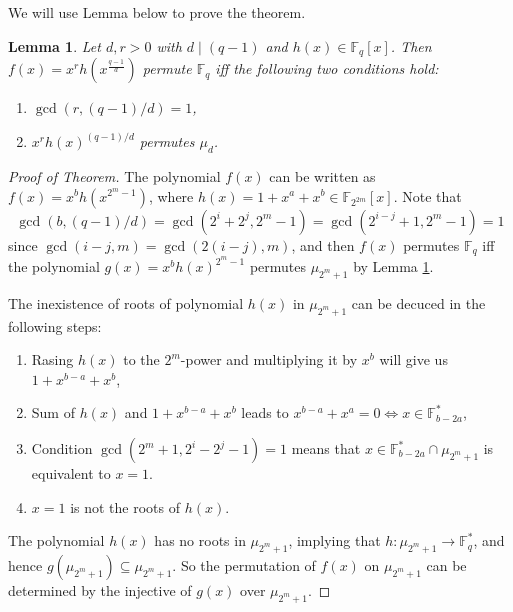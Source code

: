 \documentclass[12 pt]{article}
\newtheorem{lemma}{Lemma}
\def\F{{\mathbb F}}
\begin{document}
    We will use Lemma below to prove the theorem.
    \begin{lemma}\label{Lm:permutation_twocondition}
      Let $ d,r>0 $ with $ d\mid(q-1) $ and $ h(x)\in\F_q[x] $. Then $ f(x)=x^rh(x^{\frac{q-1}{d}}) $ permute $ \F_q $ iff the following two conditions hold:
      \begin{enumerate}[label=(\arabic{*})]
        \item $ \gcd(r,(q-1)/d)=1 $,
        \item $ x^rh(x)^{(q-1)/{d}} $ permutes $ \mu_d $.
      \end{enumerate}
    \end{lemma}

    \begin{proof}[Proof of Theorem]
      The polynomial $ f(x) $ can be written as $ f(x)=x^b h\left(x^{2^m-1}\right)$, where $h(x)=1+x^a+x^b \in \F_{2^{2m}}[x]$. 
      Note that  
      \[\gcd(b,(q-1)/d)=\gcd(2^i+2^j,2^m-1)=\gcd(2^{i-j}+1,2^m-1)=1\]
      since $ \gcd(i-j,m)=\gcd(2(i-j),m) $, and then $ f(x) $ permutes $ \F_q $ iff the polynomial $ g(x)=x^bh(x)^{2^m-1} $ 
      permutes $ \mu_{2^m+1} $ by Lemma \ref{Lm:permutation_twocondition}.
      
      The inexistence of roots of polynomial $ h(x) $ in $ \mu_{2^m+1} $ can be decuced in the following steps:
      \begin{enumerate}[label=(\arabic{*})]
        \item Rasing $ h(x) $ to the $ 2^m $-power and multiplying it by $ x^b $ will give us $ 1+x^{b-a}+x^b $,
        \item Sum of $ h(x) $ and $ 1+x^{b-a}+x^b $ leads to $ x^{b-a}+x^a=0\Leftrightarrow x\in\F_{b-2a}^* $,
        \item Condition $ \gcd(2^m+1,2^i-2^j-1)=1 $ means that $ x\in\F_{b-2a}^*\cap\mu_{2^m+1} $ 
        is equivalent to $ x=1 $.
        \item $ x=1 $ is not the roots of $ h(x) $.
      \end{enumerate}

      The polynomial $ h(x) $ has no roots in $ \mu_{2^m+1} $, implying that $ h:\mu_{2^m+1}\longrightarrow\F_q^* $, and hence 
      $ g(\mu_{2^m+1})\subseteq\mu_{2^m+1} $. So the permutation of $ f(x) $ on $ \mu_{2^m+1} $ 
      can be determined by the injective of $ g(x) $ over $ \mu_{2^m+1} $.


\end{proof}
\end{document}
